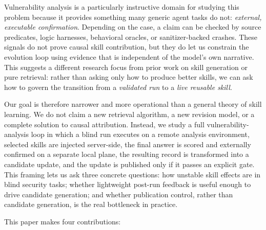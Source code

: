 ﻿\documentclass[preprint,12pt]{elsarticle}
\begin{document}
Vulnerability analysis is a particularly instructive domain for studying
this problem because it provides something many generic agent tasks do not:
\emph{external, executable confirmation}.  Depending on the case, a claim
can be checked by source predicates, logic harnesses, behavioral oracles,
or sanitizer-backed crashes.  These signals do not prove causal skill
contribution, but they do let us constrain the evolution loop using
evidence that is independent of the model's own narrative.  This suggests a
different research focus from prior work on skill generation or pure
retrieval: rather than asking only how to produce better skills, we can ask
how to govern the transition from a \emph{validated run} to a \emph{live
reusable skill}.

Our goal is therefore narrower and more operational than a general theory
of skill learning.  We do not claim a new retrieval algorithm, a new
revision model, or a complete solution to causal attribution.  Instead, we
study a full vulnerability-analysis loop in which a blind run executes on a
remote analysis environment, selected skills are injected server-side, the
final answer is scored and externally confirmed on a separate local plane,
the resulting record is transformed into a candidate update, and the update
is published only if it passes an explicit gate.  This framing lets us ask
three concrete questions: how unstable skill effects are in blind security
tasks; whether lightweight post-run feedback is useful enough to drive
candidate generation; and whether publication control, rather than
candidate generation, is the real bottleneck in practice.

This paper makes four contributions:
\end{document}
